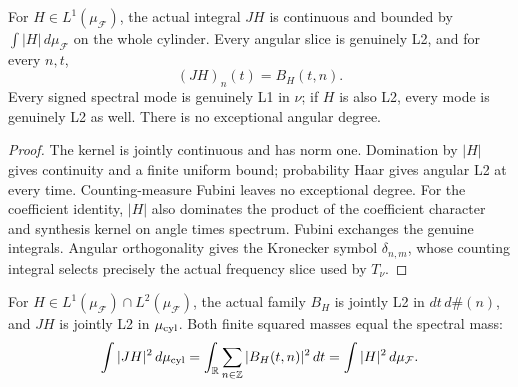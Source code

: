 \begin{lemma}
\label{lem:cylinder-joint-coefficients}
\leanok
For $H\in L^1(\mu_{\mathcal F})$, the actual integral $JH$ is continuous and
bounded by $\int|H|\,d\mu_{\mathcal F}$ on the whole cylinder.
Every angular slice is genuinely L2, and for every $n,t$,
\[
 (JH)_n(t)=B_H(t,n).
\]
Every signed spectral mode is genuinely L1 in $\nu$; if $H$ is also L2, every
mode is genuinely L2 as well. There is no exceptional angular degree.
\end{lemma}

\begin{proof}
\leanok
The kernel is jointly continuous and has norm one. Domination by $|H|$ gives
continuity and a finite uniform bound; probability Haar gives angular L2 at
every time. Counting-measure Fubini leaves no exceptional degree.
For the coefficient identity, $|H|$ also dominates the product of the
coefficient character and synthesis kernel on angle times spectrum. Fubini
exchanges the genuine integrals. Angular orthogonality gives the Kronecker
symbol $\delta_{n,m}$, whose counting integral selects precisely the actual
frequency slice used by $T_\nu$.
\end{proof}

\begin{lemma}
\label{lem:cylinder-joint-l2}
\leanok
For $H\in L^1(\mu_{\mathcal F})\cap L^2(\mu_{\mathcal F})$, the actual family
$B_H$ is jointly L2 in $dt\,d\#(n)$, and $JH$ is jointly L2 in $\mu_{\rm cyl}$.
Both finite squared masses equal the spectral mass:
\[
 \int|JH|^2\,d\mu_{\rm cyl}
 =\int_{\mathbb{R}}\sum_{n\in\mathbb{Z}}|B_H(t,n)|^2\,dt
 =\int|H|^2\,d\mu_{\mathcal F}.
\]
\end{lemma}


